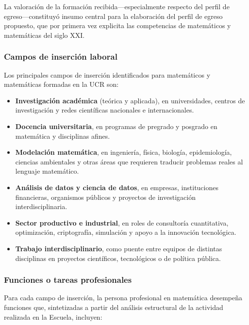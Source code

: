 La valoración de la formación recibida---especialmente respecto del perfil de egreso---constituyó insumo central para la elaboración del perfil de egreso propuesto, que por primera vez explicita las competencias de matemáticos y matemáticas del siglo XXI. %

\subsubsection{Campos de inserción laboral}

Los principales campos de inserción identificados para matemáticos y matemáticas formadas en la UCR son:

\begin{itemize}
  \item \textbf{Investigación académica} (teórica y aplicada), en universidades, centros de investigación y redes científicas nacionales e internacionales.
  \item \textbf{Docencia universitaria}, en programas de pregrado y posgrado en matemática y disciplinas afines.
  \item \textbf{Modelación matemática}, en ingeniería, física, biología, epidemiología, ciencias ambientales y otras áreas que requieren traducir problemas reales al lenguaje matemático.
  \item \textbf{Análisis de datos y ciencia de datos}, en empresas, instituciones financieras, organismos públicos y proyectos de investigación interdisciplinaria.
  \item \textbf{Sector productivo e industrial}, en roles de consultoría cuantitativa, optimización, criptografía, simulación y apoyo a la innovación tecnológica.
  \item \textbf{Trabajo interdisciplinario}, como puente entre equipos de distintas disciplinas en proyectos científicos, tecnológicos o de política pública.
\end{itemize}


\subsubsection{Funciones o tareas profesionales}

Para cada campo de inserción, la persona profesional en matemática desempeña funciones que, sintetizadas a partir del análisis estructural de la actividad realizada en la Escuela, incluyen:

